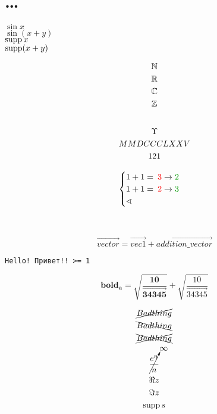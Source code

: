 \documentclass[12pt, a4paper]{article}
\begin{document}
    \section{…}

    $\sin x$\\
    $\sin(x+y)$\\
    $\operatorname{supp} x$\\
    $\operatorname{supp}(x+y)$

    \begin{gather}
        {\mathbb{N}} \\
        {\mathbb{R}} \\
        {\mathbb{C}} \\
        {\mathbb{Z}}
    \end{gather}

    \begin{equation}
        \label{eq:upsilon}
    \end{equation}

    \begin{gather}
        \Upsilon \\
        \RNumb{2875} \\
        \rm 121
    \end{gather}



    \begin{equation}
        \begin{cases}
            1+1=\correction{3}{2} \\
            1+1=\correction{2}{3} \\
            \sphericalangle 
        \end{cases}            
    \end{equation}

    \\



    \begin{equation}    
        \vec{vector} = \vec{vec1} + \vec{addition\_vector}
    \end{equation}    

    \texttt{Hello! Привет!! >= 1}

    \begin{equation}
        \symbf{bold_a = \sqrt{\frac{10}{\vec{34345}}}} + \sqrt{\frac{10}{\vec{34345}}}
    \end{equation}


    \begin{gather}
        \cancel{Bad thing}\\
        \bcancel{Bad thing}\\
        \xcancel{Bad thing}\\    
        \cancelto{\infty}{\frac{e^n}{n}}\\
        \Re z \\
        \Im z \\
        \operatorname{supp} s
    \end{gather}
\end{document}
